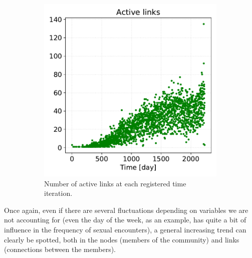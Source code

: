 \documentclass[a4paper,11pt, twocolumn]{article}
\begin{document}
\begin{figure}[H]
\begin{subfigure}[t]{0.24\textwidth}
\includegraphics[width=\textwidth]{./Figure/Static/Active_links.pdf}
\caption{Number of active links at each registered time iteration.}
\end{subfigure}
\caption{}
\end{figure}

Once again, even if there are several fluctuations depending on variables we are not accounting for (even the day of the week, as an example, has quite a bit of influence in the frequency of sexual encounters), a general increasing trend can clearly be spotted, both in the nodes (members of the community) and links (connections between the members).
\end{document}
